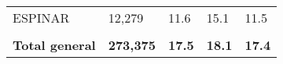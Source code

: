 \begin{tabular}{lllll}
	\cellcolor[HTML]{FF5050}ESPINAR                                & 12,279                                                                & 11.6                                                                             & 15.1                                                                        & 11.5                                                                                \\
	&                                                                       &                                                                                  &                                                                             &                                                                                     \\
	\rowcolor[HTML]{DDEBF7} 
	\textbf{Total   general}                                       & \textbf{273,375}                                                      & \textbf{17.5}                                                                    & \textbf{18.1}                                                               & \textbf{17.4}                                                                      
\end{tabular}